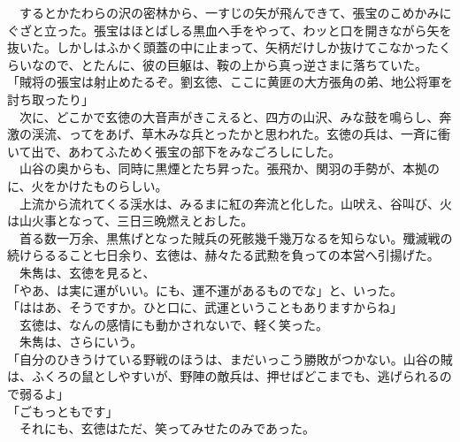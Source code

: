 \documentclass[
  paper=a5,
  fontsize=10pt,
  jafontsize=9.5pt,
  tate,                  %
  open_bracket_pos=nibu, %
]{jlreq}
\begin{document}
　するとかたわらの沢の密林から、一すじの矢が飛んできて、張宝のこめかみにぐざと立った。張宝はほとばしる黒血へ手をやって、わッと口を開きながら矢を抜いた。しかしはふかく頭蓋の中に止まって、矢柄だけしか抜けてこなかったくらいなので、とたんに、彼の巨躯は、鞍の上から真っ逆さまに落ちていた。\\


「賊将の張宝は射止めたるぞ。劉玄徳、ここに黄匪の大方張角の弟、地公将軍を討ち取ったり」\\


　次に、どこかで玄徳の大音声がきこえると、四方の山沢、みな鼓を鳴らし、奔激の渓流、ってをあげ、草木みな兵とったかと思われた。玄徳の兵は、一斉に衝いて出で、あわてふためく張宝の部下をみなごろしにした。\\


　山谷の奥からも、同時に黒煙とたち昇った。張飛か、関羽の手勢が、本拠のに、火をかけたものらしい。\\


　上流から流れてくる渓水は、みるまに紅の奔流と化した。山吠え、谷叫び、火は山火事となって、三日三晩燃えとおした。\\


　首る数一万余、黒焦げとなった賊兵の死骸幾千幾万なるを知らない。殲滅戦の続けらるること七日余り、玄徳は、赫々たる武勲を負っての本営へ引揚げた。\\


　朱雋は、玄徳を見ると、\\


「やあ、は実に運がいい。にも、運不運があるものでな」と、いった。\\


「ははあ、そうですか。ひと口に、武運ということもありますからね」\\


　玄徳は、なんの感情にも動かされないで、軽く笑った。\\


　朱雋は、さらにいう。\\


「自分のひきうけている野戦のほうは、まだいっこう勝敗がつかない。山谷の賊は、ふくろの鼠としやすいが、野陣の敵兵は、押せばどこまでも、逃げられるので弱るよ」\\


「ごもっともです」\\


　それにも、玄徳はただ、笑ってみせたのみであった。\\
\end{document}
